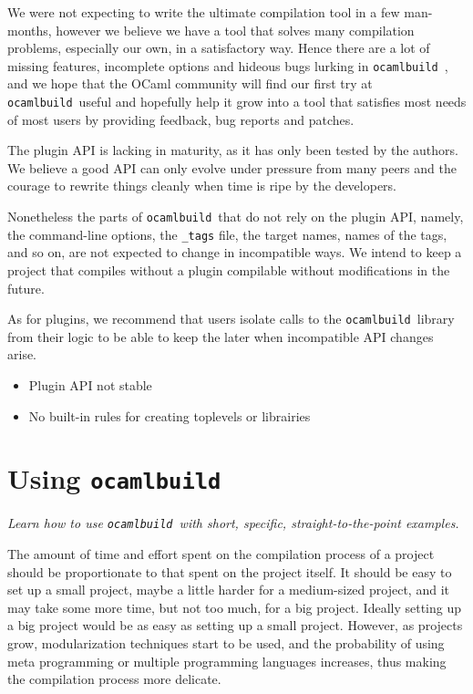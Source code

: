 \documentclass[12pt]{article}
\newcommand{\ocb}{\texttt{ocamlbuild}~}
\begin{document}
We were not expecting to write the ultimate compilation tool in a few man-months, however we believe we have
a tool that solves many compilation problems, especially our own, in a satisfactory way.  Hence there are a
lot of missing features, incomplete options and hideous bugs lurking in \ocb, and we hope that the OCaml community
will find our first try at \ocb useful and hopefully help it grow into a tool that satisfies most needs of most users
by providing feedback, bug reports and patches.

The plugin API is lacking in maturity, as it has only been tested by the
authors.  We believe a good API can only evolve under pressure from many peers
and the courage to rewrite things cleanly when time is ripe by the developers.

Nonetheless the parts of \ocb that do not rely on the plugin API, namely, the command-line
options, the \texttt{\_tags} file, the target names, names of the tags, and so
on, are not expected to change in incompatible ways.  We intend to keep a project that compiles
without a plugin compilable without modifications in the future.

As for plugins, we recommend that users isolate calls to the \ocb library from their logic
to be able to keep the later when incompatible API changes arise.

\begin{itemize}
\item Plugin API not stable
\item No built-in rules for creating toplevels or librairies
\end{itemize}
\section{Using \ocb}
{\em Learn how to use \ocb with short, specific, straight-to-the-point examples.}

The amount of time and effort spent on the compilation process of a project
should be proportionate to that spent on the project itself.  It should be easy
to set up a small project, maybe a little harder for a medium-sized project,
and it may take some more time, but not too much, for a big project.  Ideally
setting up a big project would be as easy as setting up a small project.  However,
as projects grow, modularization techniques start to be used, and the probability
of using meta programming or multiple programming languages increases, thus making
the compilation process more delicate.
\end{document}
